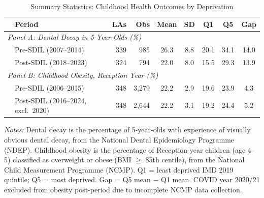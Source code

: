 \begin{table}[t]
\centering
\caption{Summary Statistics: Childhood Health Outcomes by Deprivation}
\label{tab:summary}
\begin{tabular}{llrrccccc}
\toprule
 & Period & LAs & Obs & Mean & SD & Q1 & Q5 & Gap \\
\midrule
\multicolumn{9}{l}{\textit{Panel A: Dental Decay in 5-Year-Olds (\%)}} \\
 & Pre-SDIL (2007--2014) & 339 & 985 & 26.3 & 8.8 & 20.1 & 34.1 & 14.0 \\
 & Post-SDIL (2018--2023) & 324 & 794 & 22.0 & 8.0 & 15.5 & 29.3 & 13.9 \\
[0.3em]
\multicolumn{9}{l}{\textit{Panel B: Childhood Obesity, Reception Year (\%)}} \\
 & Pre-SDIL (2006--2015) & 348 & 3,279 & 22.2 & 2.9 & 19.6 & 23.9 & 4.3 \\
 & Post-SDIL (2016--2024, excl.\ 2020) & 348 & 2,644 & 22.2 & 3.1 & 19.2 & 24.4 & 5.2 \\
\bottomrule
\end{tabular}
\par\vspace{0.3em}
{\footnotesize \textit{Notes:} Dental decay is the percentage of 5-year-olds with experience of visually obvious dental decay, from the National Dental Epidemiology Programme (NDEP). Childhood obesity is the percentage of Reception-year children (age 4--5) classified as overweight or obese (BMI $\geq$ 85th centile), from the National Child Measurement Programme (NCMP). Q1 = least deprived IMD 2019 quintile; Q5 = most deprived. Gap = Q5 mean $-$ Q1 mean. COVID year 2020/21 excluded from obesity post-period due to incomplete NCMP data collection.}
\end{table}
